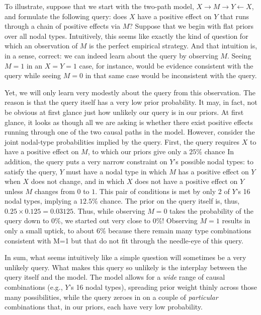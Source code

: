 \documentclass[
  12pt,
]{book}
\begin{document}
To illustrate, suppose that we start with the two-path model, \(X \rightarrow M \rightarrow Y \leftarrow X\), and formulate the following query: does \(X\) have a positive effect on \(Y\) that runs through a chain of positive effects via \(M\)? Suppose that we begin with flat priors over all nodal types. Intuitively, this seems like exactly the kind of question for which an observation of \(M\) is the perfect empirical strategy. And that intuition is, in a sense, correct: we can indeed learn about the query by observing \(M\). Seeing \(M=1\) in an \(X=Y=1\) case, for instance, would be evidence consistent with the query while seeing \(M=0\) in that same case would be inconsistent with the query.

Yet, we will only learn very modestly about the query from this observation. The reason is that the query itself has a very low prior probability. It may, in fact, not be obvious at first glance just how unlikely our query is in our priors. At first glance, it looks as though all we are asking is whether there exist positive effects running through one of the two causal paths in the model. However, consider the joint nodal-type probabilities implied by the query. First, the query requires \(X\) to have a positive effect on \(M\), to which our priors give only a \(25\%\) chance In addition, the query puts a very narrow constraint on \(Y\)'s possible nodal types: to satisfy the query, \(Y\) must have a nodal type in which \(M\) has a positive effect on \(Y\) when \(X\) does not change, and in which \(X\) does not have a positive effect on \(Y\) unless \(M\) changes from \(0\) to \(1\). This pair of conditions is met by only 2 of \(Y\)'s 16 nodal types, implying a \(12.5\%\) chance. The prior on the query itself is, thus, \(0.25 \times 0.125 = 0.03125\). Thus, while observing \(M=0\) takes the probability of the query down to \(0 \%\), we started out very close to 0\%! Observing \(M=1\) results in only a small uptick, to about \(6\%\) because there remain many type combinations consistent with M=1 but that do not fit through the needle-eye of this query.

In sum, what seems intuitively like a simple question will sometimes be a very unlikely query. What makes this query so unlikely is the interplay between the query itself and the model. The model allows for a \emph{wide} range of causal combinations (e.g., \(Y\)'s 16 nodal types), spreading prior weight thinly across those many possibilities, while the query zeroes in on a couple of \emph{particular} combinations that, in our priors, each have very low probability.
\end{document}
